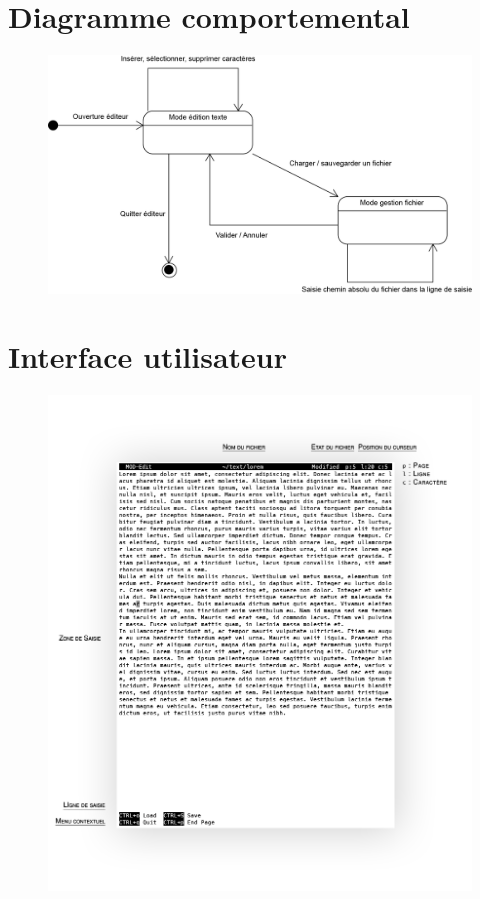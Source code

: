 \section{Diagramme comportemental}
\begin{figure}[H]
\begin{center}
    \includegraphics[width=13cm]{img/EtatsEditeur}
	\vspace{-1cm}
\end{center}
\end{figure}

\section{Interface utilisateur}
\begin{figure}[H]
\begin{center}
    \includegraphics[width=15cm]{img/MOD-Edit}
	\vspace{-1cm}
\end{center}
\end{figure}

